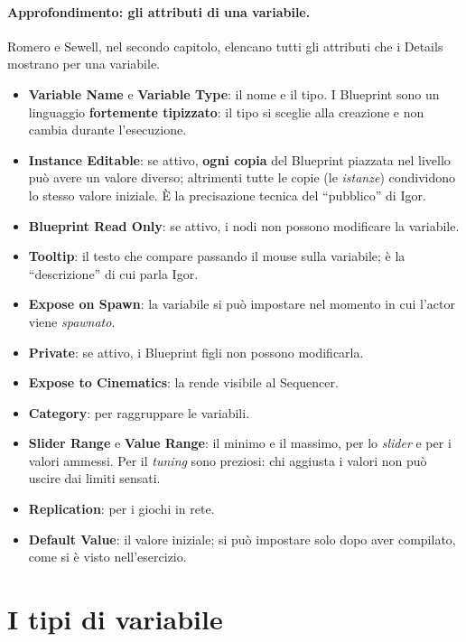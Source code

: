 \paragraph{Approfondimento: gli attributi di una variabile.} Romero e Sewell, nel secondo
capitolo, elencano tutti gli attributi che i Details mostrano per una variabile.
\begin{itemize}
  \item \textbf{Variable Name} e \textbf{Variable Type}: il nome e il tipo. I Blueprint
        sono un linguaggio \textbf{fortemente tipizzato}: il tipo si sceglie alla
        creazione e non cambia durante l'esecuzione.
  \item \textbf{Instance Editable}: se attivo, \textbf{ogni copia} del Blueprint
        piazzata nel livello può avere un valore diverso; altrimenti tutte le copie
        (le \emph{istanze}) condividono lo stesso valore iniziale. È la precisazione
        tecnica del ``pubblico'' di Igor.
  \item \textbf{Blueprint Read Only}: se attivo, i nodi non possono modificare la
        variabile.
  \item \textbf{Tooltip}: il testo che compare passando il mouse sulla variabile; è la
        ``descrizione'' di cui parla Igor.
  \item \textbf{Expose on Spawn}: la variabile si può impostare nel momento in cui
        l'actor viene \emph{spawnato}.
  \item \textbf{Private}: se attivo, i Blueprint figli non possono modificarla.
  \item \textbf{Expose to Cinematics}: la rende visibile al Sequencer.
  \item \textbf{Category}: per raggruppare le variabili.
  \item \textbf{Slider Range} e \textbf{Value Range}: il minimo e il massimo, per lo
        \emph{slider} e per i valori ammessi. Per il \emph{tuning} sono preziosi: chi
        aggiusta i valori non può uscire dai limiti sensati.
  \item \textbf{Replication}: per i giochi in rete.
  \item \textbf{Default Value}: il valore iniziale; si può impostare solo dopo aver
        compilato, come si è visto nell'esercizio.
\end{itemize}

\section{I tipi di variabile}
\label{ue2:sec:tipi}

